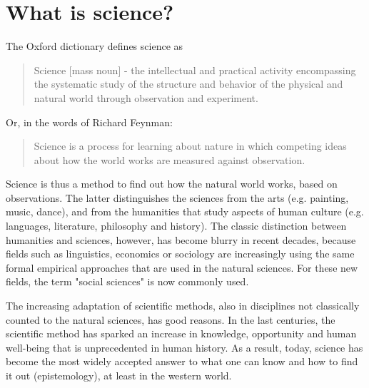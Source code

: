 \documentclass{tufte-book}
\begin{document}
\section{What is science?}

The Oxford dictionary defines science as 

\begin{quote}
Science [mass noun] - the intellectual and practical activity encompassing the systematic study of the structure and behavior of the physical and natural world through observation and experiment.
\end{quote}

\noindent Or, in the words of Richard Feynman:

\begin{quote}
Science is a process for learning about nature in which competing ideas about how the world works are measured against observation.
\end{quote}

Science is thus a method to find out how the natural world works, based on observations. The latter distinguishes the sciences from the arts (e.g. painting, music, dance), and from the humanities that study aspects of human culture (e.g. languages, literature, philosophy and history). The classic distinction between humanities and sciences, however, has become blurry in recent decades, because fields such as linguistics, economics or sociology are increasingly using the same formal empirical approaches that are used in the natural sciences. For these new fields, the term "social sciences" is now commonly used. 

The increasing adaptation of scientific methods, also in disciplines not classically counted to the natural sciences, has good reasons. In the last centuries, the scientific method has sparked an increase in knowledge, opportunity and human well-being that is unprecedented in human history. As a result, today, science has become the most widely accepted answer to what one can know and how to find it out (epistemology), at least in the western world. 
\end{document}
